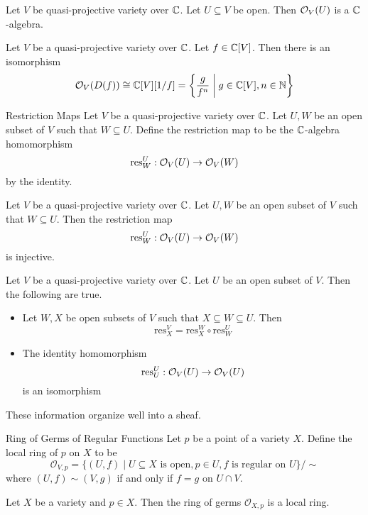\documentclass[a4paper]{article}
\begin{document}
\begin{lmm}{}{} Let $V$ be quasi-projective variety over $\mathbb{C}$. Let $U\subseteq V$ be open. Then $\mathcal{O}_V(U)$ is a $\mathbb{C}$-algebra. 
\end{lmm}

\begin{prp}{}{} Let $V$ be a quasi-projective variety over $\mathbb{C}$. Let $f\in\mathbb{C}[V]$. Then there is an isomorphism $$\mathcal{O}_V(D(f))\cong\mathbb{C}[V][1/f]=\left\{\frac{g}{f^n}\;\bigg{|}\;g\in\mathbb{C}[V],n\in\mathbb{N}\right\}$$
\end{prp}

\begin{defn}{Restriction Maps}{} Let $V$ be a quasi-projective variety over $\mathbb{C}$. Let $U,W$ be an open subset of $V$ such that $W\subseteq U$. Define the restriction map to be the $\mathbb{C}$-algebra homomorphism $$\text{res}_W^U:\mathcal{O}_V(U)\to\mathcal{O}_V(W)$$ by the identity. 
\end{defn}

\begin{prp}{}{} Let $V$ be a quasi-projective variety over $\mathbb{C}$. Let $U,W$ be an open subset of $V$ such that $W\subseteq U$. Then the restriction map $$\text{res}_W^U:\mathcal{O}_V(U)\to\mathcal{O}_V(W)$$ is injective. 
\end{prp}

\begin{prp}{}{} Let $V$ be a quasi-projective variety over $\mathbb{C}$. Let $U$ be an open subset of $V$. Then the following are true. 
\begin{itemize}
\item Let $W,X$ be open subsets of $V$ such that $X\subseteq W\subseteq U$. Then $$\text{res}_X^V=\text{res}_X^W\circ\text{res}_W^U$$
\item The identity homomorphism $$\text{res}_U^U:\mathcal{O}_V(U)\to\mathcal{O}_V(U)$$ is an isomorphism
\end{itemize}
\end{prp}

These information organize well into a sheaf. 

\begin{defn}{Ring of Germs of Regular Functions}{} Let $p$ be a point of a variety $X$. Define the local ring of $p$ on $X$ to be $$\mathcal{O}_{V,p}=\{(U,f)\;|\;U\subseteq X\text{ is open}, p\in U, f\text{ is regular on }U\}/\sim$$ where $(U,f)\sim(V,g)$ if and only if $f=g$ on $U\cap V$. 
\end{defn}

\begin{prp}{}{} Let $X$ be a variety and $p\in X$. Then the ring of germs $\mathcal{O}_{X,p}$ is a local ring. 
\end{prp}
\end{document}
